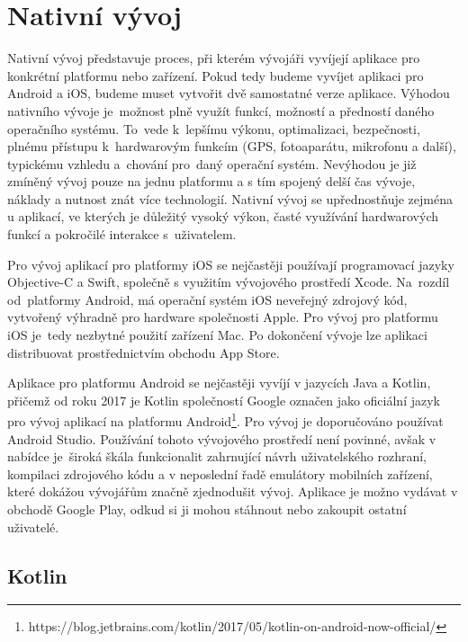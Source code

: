 \documentclass[czech, bc, kiv, he, iso690numb]{fasthesis}
\begin{document}
\section{Nativní vývoj} \label{native_development}
Nativní vývoj představuje proces, při kterém vývojáři vyvíjejí aplikace pro konkrétní platformu nebo zařízení. Pokud tedy budeme vyvíjet aplikaci pro Android a iOS, budeme muset vytvořit dvě samostatné verze aplikace. Výhodou nativního vývoje je~možnost plně využít funkcí, možností a předností daného operačního systému. To~vede k~lepšímu výkonu, optimalizaci, bezpečnosti, plnému přístupu k~hardwarovým funkcím (\gls{GPS}, fotoaparátu, mikrofonu a další), typickému vzhledu a~chování pro~daný operační systém. Nevýhodou je již zmíněný vývoj pouze na jednu platformu a s tím spojený delší čas vývoje, náklady a nutnost znát více technologií. Nativní vývoj se upřednostňuje zejména u aplikací, ve kterých je důležitý vysoký výkon, časté využívání hardwarových funkcí a pokročilé interakce s~uživatelem. \cite{native_apps} \cite{native-vs-multiplatform}

\vspace{0.5cm}

Pro vývoj aplikací pro platformy iOS se nejčastěji používají programovací jazyky Objective-C a Swift, společně s využitím vývojového prostředí Xcode. Na~rozdíl od~platformy Android, má operační systém iOS neveřejný zdrojový kód, vytvořený výhradně pro hardware společnosti Apple. Pro vývoj pro platformu iOS je~tedy nezbytné použití zařízení Mac. Po dokončení vývoje lze aplikaci distribuovat prostřednictvím obchodu App Store. \cite{raygun-native-development}

Aplikace pro platformu Android se nejčastěji vyvíjí v jazycích Java a Kotlin, přičemž od roku 2017 je Kotlin společností Google označen jako oficiální jazyk pro vývoj aplikací na platformu Android\footnote{https://blog.jetbrains.com/kotlin/2017/05/kotlin-on-android-now-official/}. Pro vývoj je doporučováno používat Android Studio. Používání tohoto vývojového prostředí není povinné, avšak v nabídce je~široká škála funkcionalit zahrnující návrh uživatelského rozhraní, kompilaci zdrojového kódu a v neposlední řadě emulátory mobilních zařízení, které dokážou vývojářům značně zjednodušit vývoj. Aplikace je možno vydávat v obchodě Google Play, odkud si ji mohou stáhnout nebo zakoupit ostatní uživatelé. \cite{Michal_Zopp} \cite{raygun-native-development}


\subsection{Kotlin}
\end{document}
